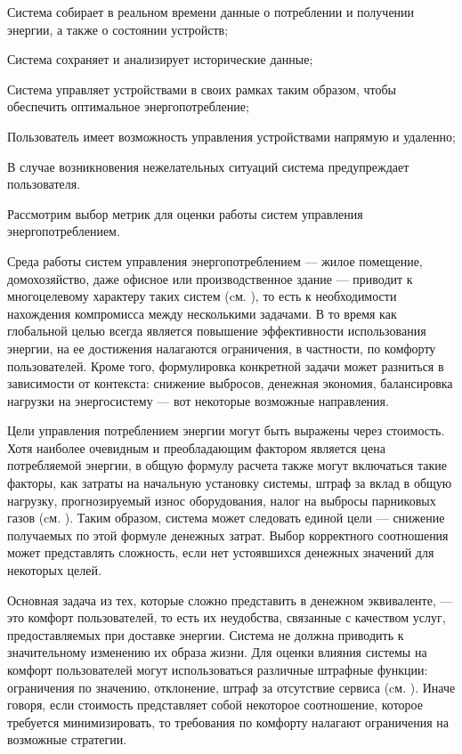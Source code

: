 \begin{textitemize}
	\item Система собирает в реальном времени данные о потреблении и получении энергии, а также о состоянии устройств;
	\item Система сохраняет и анализирует исторические данные;
	\item Система управляет устройствами в своих рамках таким образом, чтобы обеспечить оптимальное энергопотребление;
	\item Пользователь имеет возможность управления устройствами напрямую и удаленно;
	\item В случае возникновения нежелательных ситуаций система предупреждает пользователя.
\end{textitemize}

Рассмотрим выбор метрик для оценки работы систем управления энергопотреблением.

Среда работы систем управления энергопотреблением --- жилое помещение, домохозяйство, даже офисное или производственное здание --- приводит к многоцелевому характеру таких систем (cм. ), то есть к необходимости нахождения компромисса между несколькими задачами. В то время как глобальной целью всегда является повышение эффективности использования энергии, на ее достижения налагаются ограничения, в частности, по комфорту пользователей. Кроме того, формулировка конкретной задачи может разниться в зависимости от контекста: снижение выбросов, денежная экономия, балансировка нагрузки на энергосистему — вот некоторые возможные направления.

Цели управления потреблением энергии могут быть выражены через стоимость. Хотя наиболее очевидным и преобладающим фактором является цена потребляемой энергии, в общую формулу расчета также могут включаться такие факторы, как затраты на начальную установку системы, штраф за вклад в общую нагрузку, прогнозируемый износ оборудования, налог на выбросы парниковых газов (cм. ). Таким образом, система может следовать единой цели — снижение получаемых по этой формуле денежных затрат. Выбор корректного соотношения может представлять сложность, если нет устоявшихся денежных значений для некоторых целей.

Основная задача из тех, которые сложно представить в денежном эквиваленте, — это комфорт пользователей, то есть их неудобства, связанные с качеством услуг, предоставляемых при доставке энергии. Система не должна приводить к значительному изменению их образа жизни. Для оценки влияния системы на комфорт пользователей могут использоваться различные штрафные функции: ограничения по значению, отклонение, штраф за отсутствие сервиса (cм. ). Иначе говоря, если стоимость представляет собой некоторое соотношение, которое требуется минимизировать, то требования по комфорту налагают ограничения на возможные стратегии.


